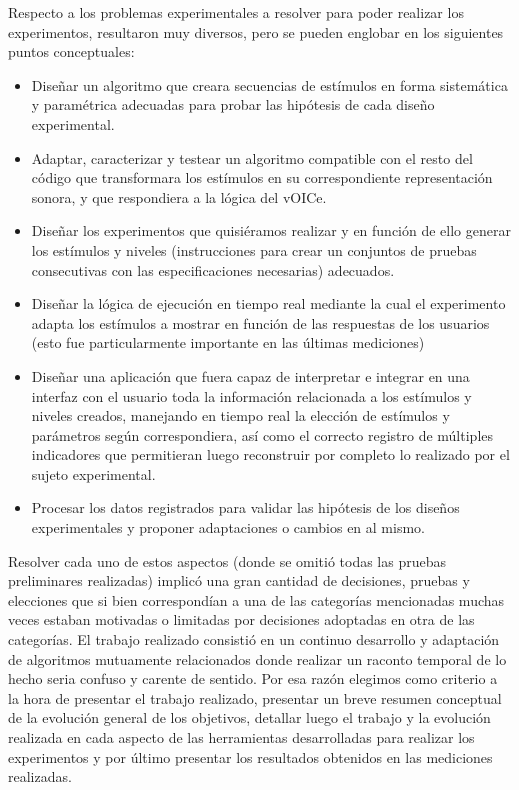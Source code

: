\documentclass{article}
\begin{document}
    Respecto a los problemas experimentales a resolver para poder realizar los experimentos, resultaron muy diversos, pero se pueden englobar en los siguientes puntos conceptuales: 
    
    \begin{itemize}
        \item Diseñar un algoritmo que creara secuencias de estímulos en forma sistemática y paramétrica adecuadas para probar las hipótesis de cada diseño experimental. 
        \item Adaptar, caracterizar y testear un algoritmo compatible con el resto del código que transformara los estímulos en su correspondiente representación sonora, y que respondiera a la lógica del vOICe. 
        \item Diseñar los experimentos que quisiéramos realizar y en función de ello generar los estímulos y niveles (instrucciones para crear un conjuntos de pruebas consecutivas con las especificaciones necesarias) adecuados.
        \item Diseñar la lógica de ejecución en tiempo real mediante la cual el experimento adapta los estímulos a mostrar en función de las respuestas de los usuarios (esto fue particularmente importante en las últimas mediciones)
        \item Diseñar una aplicación que fuera capaz de interpretar e integrar en una interfaz con el usuario toda la información relacionada a los estímulos y niveles creados, manejando en tiempo real la elección de estímulos y parámetros según correspondiera, así como el correcto registro de múltiples indicadores que permitieran luego reconstruir por completo lo realizado por el sujeto experimental. 
        \item Procesar los datos registrados para validar las hipótesis de los diseños experimentales y proponer adaptaciones o cambios en al mismo. 
    \end{itemize}
    
    Resolver cada uno de estos aspectos (donde se omitió todas las pruebas preliminares realizadas) implicó una gran cantidad de decisiones, pruebas y elecciones que si bien correspondían a una de las categorías mencionadas muchas veces estaban motivadas o limitadas por decisiones adoptadas en otra de las categorías. El trabajo realizado consistió en un continuo desarrollo y adaptación de algoritmos mutuamente relacionados donde realizar un raconto temporal de lo hecho seria confuso y carente de sentido. Por esa razón elegimos como criterio a la hora de presentar el trabajo realizado, presentar un breve resumen conceptual de la evolución general de los objetivos, detallar luego el trabajo y la evolución realizada en cada aspecto de las herramientas desarrolladas para realizar los experimentos y por último presentar los resultados obtenidos en las mediciones realizadas. 
    
\end{document}
